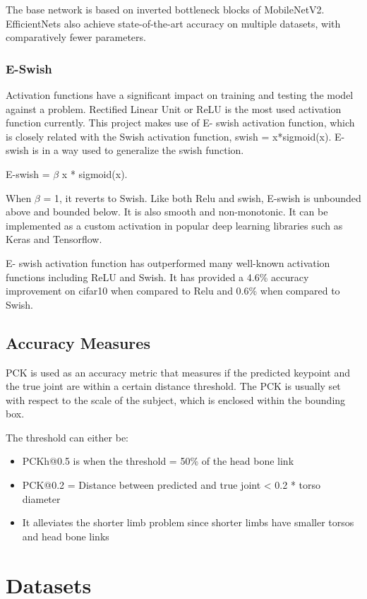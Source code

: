 \documentclass{fisatprojectfinal}
\begin{document}
The base network is based on inverted bottleneck blocks of MobileNetV2. EfficientNets also achieve state-of-the-art accuracy on multiple datasets, with comparatively fewer parameters.

\subsection{E-Swish}

Activation functions have a significant impact on training and testing the model against a problem. Rectified Linear Unit or ReLU is the most used activation function currently.  This project makes use of E- swish activation function, which is closely related with the Swish activation function, swish = x*sigmoid(x). E- swish is in a way used to generalize the swish function. 

E-swish = $\beta$ x * sigmoid(x). 

When $\beta$ = 1, it reverts to Swish. Like both Relu and swish, E-swish is unbounded above and bounded below. It is also smooth and non-monotonic. It can be implemented as a custom activation in popular deep learning libraries such as Keras and Tensorflow.

E- swish activation function has outperformed many well-known activation functions including ReLU and Swish. It has provided a 4.6\% accuracy improvement on cifar10 when compared to Relu and 0.6\% when compared to Swish.

\section{Accuracy Measures}
PCK is used as an accuracy metric that measures if the predicted keypoint and the true joint are within a certain distance threshold. The PCK is usually set with respect to the scale of the subject, which is enclosed within the bounding box.

The threshold can either be:
\begin{itemize}
    \item PCKh@0.5 is when the threshold = 50\% of the head bone link
    \item PCK@0.2 = Distance between predicted and true joint < 0.2 * torso diameter
    \item It alleviates the shorter limb problem since shorter limbs have smaller torsos and head bone links
\end{itemize}
\chapter{Datasets}
\end{document}
